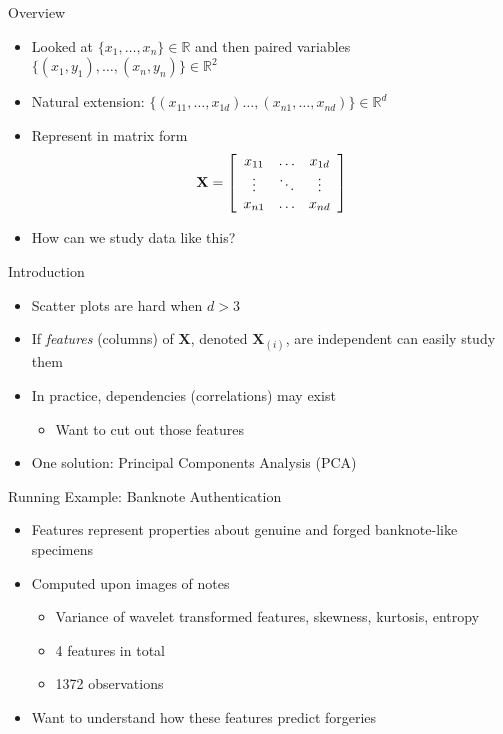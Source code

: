 \documentclass{beamer}
\begin{document}
\begin{frame}{Overview} 
\begin{itemize} 
 \item Looked at $\{x_1, \ldots, x_n\} \in \mathbb{R}$ and then paired variables $\{(x_1, y_1), \ldots, (x_n, y_n)\} \in \mathbb{R}^2$
\item Natural extension: $\{(x_{11}, \ldots, x_{1d}) \ldots, (x_{n1}, \ldots, x_{nd})\} \in \mathbb{R}^d$
\item Represent in matrix form 
\begin{displaymath} 
 \textbf{X} = \left[\begin{array}{c c c} x_{11} & \ldots & x_{1d} \\ 
                     \vdots & \ddots & \vdots \\
 x_{n1} & \ldots & x_{nd}  \end{array} \right] 
\end{displaymath}
\item How can we study data like this? 
 \end{itemize}
\end{frame}

\begin{frame}{Introduction}
\begin{itemize} 
 \item Scatter plots are hard when $d > 3$ 
 \item If \emph{features} (columns) of $\textbf{X}$, denoted $\textbf{X}_{(i)}$, are independent can easily study them 
 \item In practice, dependencies (correlations) may exist
  \begin{itemize}
    \item Want to cut out those features
    \end{itemize}
    \item One solution: Principal Components Analysis (PCA)
\end{itemize}
\end{frame}

\begin{frame}{Running Example: Banknote Authentication} 
\begin{itemize}
 \item Features represent properties about genuine and forged banknote-like specimens
 \item Computed upon images of notes 
 \begin{itemize}
  \item Variance of wavelet transformed features, skewness, kurtosis, entropy 
  \item 4 features in total 
  \item 1372 observations 
 \end{itemize}
 \item Want to understand how these features predict forgeries 
\end{itemize}
\end{frame}
\end{document}
